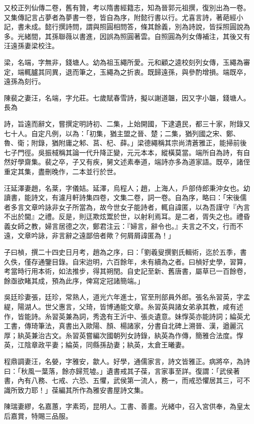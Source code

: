 \begin{pinyinscope}
又校正列仙傳二卷，舊有贊，考以隋書經籍志，知為晉郭元祖撰，復別出為一卷。又集傳記言占夢者為夢書一卷，皆自為序，附懿行書以行。尤喜言詩，著葩經小記，書未成。懿行撰詩問，謂與照圓相問答，條其餘義，別為詩說，皆採照圓說為多。光緒間，其孫聯薇以書進，因誤為照圓著雲。自照圓為列女傳補注，其後又有汪遠孫妻梁校注。

梁，名端，字無非，錢塘人。幼為祖玉繩所愛。元和顧之逵校刻列女傳，玉繩為審定，端輒臚其同異，退而筆之，玉繩為之折衷。既歸遠孫，與參酌增損。端既卒，遠孫為刻行。

陳裴之妻汪，名端，字允莊。七歲賦春雪詩，擬以謝道韞，因又字小韞，錢塘人。長為

詩，旨遠而辭文，嘗撰定明詩初、二集，上始開國，下逮遺民，都三十家，附錄又七十人。自定凡例，以為：「初集，猶主盟之晉、楚；二集，猶列國之宋、鄭、魯、衛；附錄，猶附庸之邾、莒、杞、薛。」梁德繩稱其宗尚清蒼雅正，能掃前後七子門徑。吳振棫稱其論一代升降正變，元元本本，縱橫莫當。端所自為詩，有自然好學齋集。裴之卒，子又有疾，舅文述素奉道，端詩亦多為道家語。既卒，諸侄重定其集，盡刪晚作，二本並行於世。

汪延澤妻趙，名棻，字儀姞。延澤，烏程人；趙，上海人，戶部侍郎秉沖女也。幼讀書，能詩文，有濾月軒詩集四卷，文集二卷，詞一卷。自為序，略曰：「宋後儒者多言文章吟詠非女子所當為，故今世女子能詩者，輒自諱匿，以為吾謹守『內言不出於閫』之禮。反是，則迋欺炫鬻於世，以射利焉耳。是二者，胥失之也。禮昏義女師之教，婦言居德之次，鄭君注云：『婦言，辭令也。』夫言之不文，行而不遠，文章吟詠，非言辭之遠鄙倍者歟？何屑屑諱匿為！」

子曰楨，撰二十四史日月考，趙為之序，曰：「劉羲叟撰劉氏輯術，迄於五季，書久佚，僅存通鑒目錄。自宋迨明，六百餘年，未有續為之者。曰楨好史學，習算，考當時行用本術，如法推步，得其朔閏。自史記至新、舊唐書，屬草已一百餘卷，餘亟欲睹其成，預為此序，俾寫定冠諸簡端。」

吳廷珍妻張，廷珍，常熟人，道光六年進士，官至刑部員外郎。張名糸習英，字孟緹，陽湖人。世父惠言，父琦，皆博通能文章。糸習英與諸女弟承其教，咸有述作，皆能詩。糸習英兼為詞，秀逸有王沂中、張炎遺意。妹惸英亦能詩詞；綸英尤工書，傳琦筆法，真書出入歐陽、顏、楊諸家，分書自北碑上溯晉、漢，遒麗沉厚；紈英兼治古文。糸習英嘗編次國朝列女詩錄，紈英為作傳，簡雅合法度。惸英，江陰章政平妻；綸英，同縣孫劼妻；紈英，太倉王曦妻。

程鼎調妻汪，名嫈，字雅安，歙人。好學，通儒家言，詩文皆雅正。病將卒，為詩曰：「秋風一葉落，餘亦歸荒墟。」遺書戒其子葆，言家事至詳。復謂：「武侯著書，內有八務、七戒、六恐、五懼，武侯第一流人，務一，而戒恐懼居其三，可不識所致力耶！」葆編其所作為雅安書屋詩文集。

陳瑞妻繆，名嘉蕙，字素筠，昆明人。工書、善畫。光緒中，召入宮供奉，為皇太后嘉賞，特賜三品服。


\end{pinyinscope}
